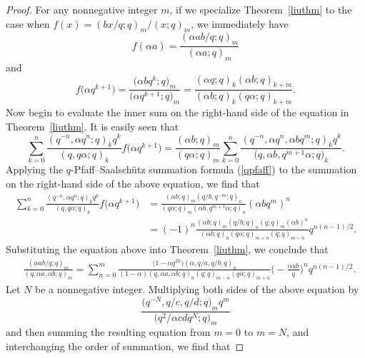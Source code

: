 \documentclass[pdftex]{sigma}
\numberwithin{equation}{section}
\begin{document}
\begin{proof} For any nonnegative integer $m$, if we specialize Theorem~\ref{liuthm} to the case when $f(x)=(bx/q; q)_m/{(x; q)_m}$, we immediately have
\begin{equation*}%
f(\alpha a)=\frac{(\alpha ab/q; q)_m}{(\alpha a; q)_m}
\end{equation*}	
and
\begin{equation*}%
f\bigl(\alpha q^{k+1}\bigr)=\frac{\bigl(\alpha bq^{k}; q \bigr)_m}{\bigl(\alpha q^{k+1}; q\bigr)_m}=\frac{(\alpha q; q)_k (\alpha b;q)_{k+m}}{(\alpha b; q)_k (q\alpha ; q)_{k+m}}.	
\end{equation*}	
Now begin to evaluate the inner sum on the right-hand side of the equation in Theorem~\ref{liuthm}. It is easily seen that
\begin{equation*}%
\sum_{k=0}^n \frac{(q^{-n}, \alpha q^n; q)_k q^k}
{(q, q\alpha; q)_k} f\bigl(\alpha q^{k+1}\bigr)
=\frac{(\alpha b; q)_m}{(q\alpha; q)_m}
\sum_{k=0}^n \frac{(q^{-n}, \alpha q^n, \alpha b q^m; q)_k q^k}
{\bigl(q, \alpha b, q^{m+1}\alpha; q\bigr)_k}.
\end{equation*}
Applying the $q$-Pfaff--Saalsch\"{u}tz summation formula (\ref{qpfaff}) to the summation on the right-hand side of the above equation, we find that
\begin{align*}%
\sum_{k=0}^n \frac{(q^{-n}, \alpha q^n; q)_k q^k}
{(q, q\alpha; q)_k} f\bigl(\alpha q^{k+1}\bigr)&{}=\frac{(\alpha b; q)_m (q/b, q^{-m}; q)_n}{(q\alpha; q)_m
(\alpha b, q^{m+1}\alpha; q)_n} (\alpha b q^m)^n\\
&{}=(-1)^n \frac{(\alpha b; q)_m (q/b; q)_n (q; q)_m(\alpha b)^n}{(\alpha b; q)_n (q\alpha; q)_{m+n} (q; q)_{m-n}} q^{n(n-1)/2}.\nonumber
\end{align*}
Substituting the equation above into Theorem~\ref{liuthm}, we conclude that
\begin{align*}%
&\frac{(\alpha ab/q; q)_m}{(q, \alpha a, \alpha b; q)_m}
=\sum_{n=0}^m \frac{\bigl(1-\alpha q^{2n}\bigr) (\alpha, q/a, q/b; q)_n}{(1-\alpha)(q, \alpha a, \alpha b; q)_n (q; q)_{m-n} (q\alpha; q)_{m+n}}\biggl(-\frac{\alpha ab}{q}\biggr)^n q^{n(n-1)/2}. \nonumber
\end{align*}
Let $N$ be a nonnegative integer. Multiplying both sides of the above equation by
\[
\frac{\bigl(q^{-N}, q/c, q/d; q\bigr)_m q^m}{\bigl(q^2/\alpha cdq^N; q\bigr)_m}
\]
and then summing the resulting equation from $m=0$ to $m=N$, and interchanging the order of summation, we find that

\end{proof}
\end{document}
